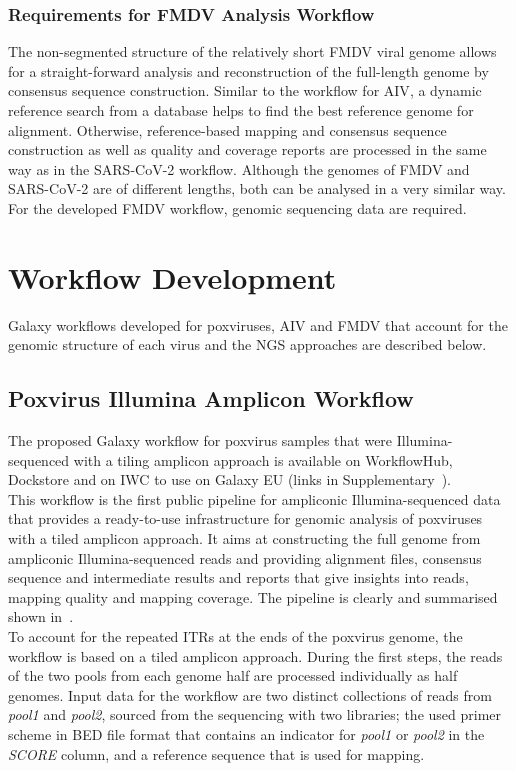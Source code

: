 \subsubsection{Requirements for FMDV Analysis Workflow}
The non-segmented structure of the relatively short \ac{FMDV} viral genome allows for a straight-forward analysis and reconstruction of the full-length genome by consensus sequence construction. Similar to the workflow for \ac{AIV}, a dynamic reference search from a database helps to find the best reference genome for alignment. Otherwise, reference-based mapping and consensus sequence construction as well as quality and coverage reports are processed in the same way as in the \ac{SARS-CoV-2} workflow. Although the genomes of \ac{FMDV} and \ac{SARS-CoV-2} are of different lengths, both can be analysed in a very similar way. For the developed \ac{FMDV} workflow, genomic sequencing data are required.

\section{Workflow Development}
Galaxy workflows developed for poxviruses, \ac{AIV} and \ac{FMDV} that account for the genomic structure of each virus and the NGS approaches are described below.

\subsection{Poxvirus Illumina Amplicon Workflow}\label{sec:pox-wf}
The proposed Galaxy workflow for poxvirus samples that were Illumina-sequenced with a tiling amplicon approach is available on WorkflowHub, Dockstore and on \ac{IWC} to use on Galaxy EU (links in Supplementary~). \\
This workflow is the first public pipeline for ampliconic Illumina-sequenced data that provides a ready-to-use infrastructure for genomic analysis of poxviruses with a tiled amplicon approach. It aims at constructing the full genome from ampliconic Illumina-sequenced reads and providing alignment files, consensus sequence and intermediate results and reports that give insights into reads, mapping quality and mapping coverage. %
The pipeline is clearly and summarised shown in~. \\ 
To account for the repeated \acp{ITR} at the ends of the poxvirus genome, the workflow is based on a tiled amplicon approach. During the first steps, the reads of the two pools from each genome half are processed individually as half genomes. Input data for the workflow are two distinct collections of reads from \textit{pool1} and \textit{pool2}, sourced from the sequencing with two libraries; the used primer scheme in \ac{BED} file format that contains an indicator for \textit{pool1} or \textit{pool2} in the \textit{SCORE} column, and a reference sequence that is used for mapping. 


